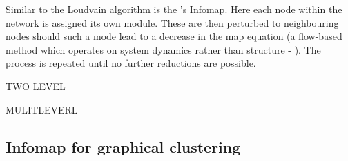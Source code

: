 Similar to the Loudvain algorithm is the \cite{infomap}'s Infomap. Here each node within the network is assigned its own module. These are then perturbed to neighbouring nodes should such a mode lead to a decrease in the map equation (a flow-based method which operates on system dynamics rather than structure - \citep{mapeqn}). The process is repeated until no further reductions are possible.

TWO LEVEL 

MULITLEVERL


% 

% 


\subsection{Infomap for graphical clustering }

